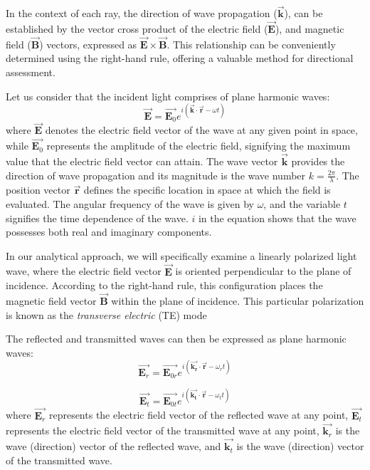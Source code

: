 In the context of each ray, the direction of wave propagation ($\vec{\mathbf{k}}$), can be established by the vector cross product of the electric field ($\vec{\mathbf{E}}$), and magnetic field ($\vec{\mathbf{B}}$) vectors, expressed as $\vec{\mathbf{E}} \times \vec{\mathbf{B}}$. This relationship can be conveniently determined using the right-hand rule, offering a valuable method for directional assessment.

Let us consider that the incident light comprises of plane harmonic waves:
\begin{equation} \label{Plane harmonic wave equation - incident}
\vec{\mathbf{E}} = \vec{\mathbf{E}_0} e^{i(\vec{\mathbf{k}} \cdot \vec{\mathbf{r}} - \omega t)}
\end{equation} where $\vec{\mathbf{E}}$ denotes the electric field vector of the wave at any given point in space, while $\vec{\mathbf{E}_0}$ represents the amplitude of the electric field, signifying the maximum value that the electric field vector can attain. The wave vector $\vec{\mathbf{k}}$ provides the direction of wave propagation and its magnitude is the wave number $k=\frac{2\pi}{\lambda}$. The position vector $\vec{\mathbf{r}}$ defines the specific location in space at which the field is evaluated. The angular frequency of the wave is given by $\omega$, and the variable $t$ signifies the time dependence of the wave. $i$ in the equation shows that the wave possesses both real and imaginary components.

In our analytical approach, we will specifically examine a linearly polarized light wave, where the electric field vector $\vec{\mathbf{E}}$ is oriented perpendicular to the plane of incidence. According to the right-hand rule, this configuration places the magnetic field vector $\vec{\mathbf{B}}$ within the plane of incidence. This particular polarization is known as the \textit{transverse electric} (TE) mode

The reflected and transmitted waves can then be expressed as plane harmonic waves:
\begin{equation} \label{Plane harmonic wave equation - reflected}
\vec{\mathbf{E}_r} = \vec{\mathbf{E}_{0r}} e^{i(\vec{\mathbf{k_r}} \cdot \vec{\mathbf{r}} - \omega_r t)}
\end{equation}

\begin{equation} \label{Plane harmonic wave equation - refracted}
\vec{\mathbf{E}_t} = \vec{\mathbf{E}_{0t}} e^{i(\vec{\mathbf{k_t}} \cdot \vec{\mathbf{r}} - \omega_t t)}
\end{equation} where $\vec{\mathbf{E}_r}$ represents the electric field vector of the reflected wave at any point, $\vec{\mathbf{E}_t}$ represents the electric field vector of the transmitted wave at any point, $\vec{\mathbf{k}_r}$ is the wave (direction) vector of the reflected wave, and $\vec{\mathbf{k}_t}$ is the wave (direction) vector of the transmitted wave.

